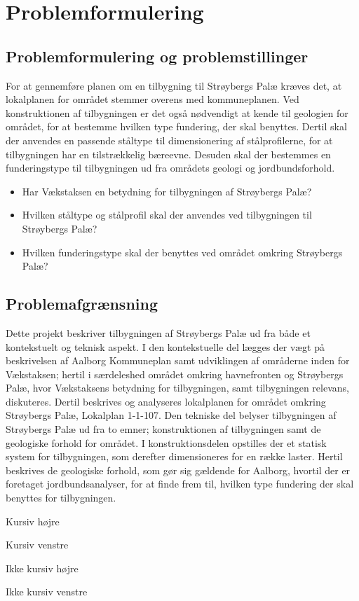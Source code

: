 \chapter{Problemformulering}

\section{Problemformulering og problemstillinger}
For at gennemføre planen om en tilbygning til Strøybergs Palæ kræves det, at lokalplanen for området stemmer overens med kommuneplanen. Ved konstruktionen af tilbygningen er det også nødvendigt at kende til geologien for området, for at bestemme hvilken type fundering, der skal benyttes. Dertil skal der anvendes en passende ståltype til dimensionering af stålprofilerne, for at tilbygningen har en tilstrækkelig bæreevne. Desuden skal der bestemmes en funderingstype til tilbygningen ud fra områdets geologi og jordbundsforhold. 

\begin{itemize} 
	\item Har Vækstaksen en betydning for tilbygningen af Strøybergs Palæ?
	\item Hvilken ståltype og stålprofil skal der anvendes ved tilbygningen til Strøybergs Palæ? 
	\item Hvilken funderingstype skal der benyttes ved området omkring Strøybergs Palæ? 
\end{itemize} 

\section{Problemafgrænsning}
Dette projekt beskriver tilbygningen af Strøybergs Palæ ud fra både et kontekstuelt og teknisk aspekt. I den kontekstuelle del lægges der vægt på beskrivelsen af Aalborg Kommuneplan samt udviklingen af områderne inden for Vækstaksen; hertil i særdeleshed området omkring havnefronten og Strøybergs Palæ, hvor Vækstaksens betydning for tilbygningen, samt tilbygningen relevans, diskuteres. Dertil beskrives og analyseres lokalplanen for området omkring Strøybergs Palæ, Lokalplan 1-1-107.
\newline \indent{     }  Den tekniske del belyser tilbygningen af Strøybergs Palæ ud fra to emner; konstruktionen af tilbygningen samt de geologiske forhold for området. I konstruktionsdelen opstilles der et statisk system for tilbygningen, som derefter dimensioneres for en række laster. 
\newline \indent{     }  Hertil beskrives de geologiske forhold, som gør sig gældende for Aalborg, hvortil der er foretaget jordbundsanalyser, for at finde frem til, hvilken type fundering der skal benyttes for tilbygningen.  

Kursiv højre

Kursiv venstre

Ikke kursiv højre

Ikke kursiv venstre
